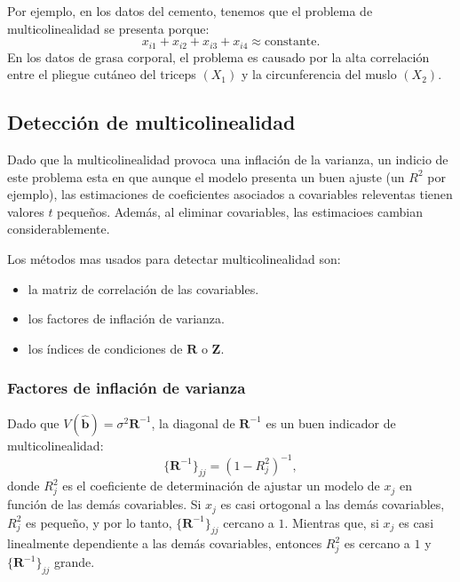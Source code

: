 \documentclass[
]{article}
\begin{document}
Por ejemplo, en los datos del cemento, tenemos que el problema de multicolinealidad se presenta porque:
\[
x_{i1} + x_{i2} + x_{i3} + x_{i4} \approx \mbox{constante}.   
\]
En los datos de grasa corporal, el problema es causado por la alta correlación entre el pliegue cutáneo del triceps \((X_{1})\) y la circunferencia del muslo \((X_{2})\).

\hypertarget{detecciuxf3n-de-multicolinealidad}{%
\subsection{Detección de multicolinealidad}\label{detecciuxf3n-de-multicolinealidad}}

Dado que la multicolinealidad provoca una inflación de la varianza, un indicio de este problema esta en que aunque el modelo presenta un buen ajuste (un \(R^2\) por ejemplo), las estimaciones de coeficientes asociados a covariables releventas tienen valores \(t\) pequeños. Además, al eliminar covariables, las estimacioes cambian considerablemente.

Los métodos mas usados para detectar multicolinealidad son:

\begin{itemize}
\item
  la matriz de correlación de las covariables.
\item
  los factores de inflación de varianza.
\item
  los índices de condiciones de \(\boldsymbol R\) o \(\boldsymbol Z\).
\end{itemize}

\hypertarget{factores-de-inflaciuxf3n-de-varianza}{%
\subsubsection{Factores de inflación de varianza}\label{factores-de-inflaciuxf3n-de-varianza}}

Dado que \(V(\widehat{\boldsymbol b}) = \sigma^2\boldsymbol R^{-1}\), la diagonal de \(\boldsymbol R^{-1}\) es un buen indicador de multicolinealidad:
\[
\{\boldsymbol R^{-1}\}_{jj} = (1-R_{j}^{2})^{-1},
\]
donde \(R_{j}^{2}\) es el coeficiente de determinación de ajustar un modelo de \(x_{j}\) en función de las demás covariables. Si \(x_{j}\) es casi ortogonal a las demás covariables, \(R^{2}_{j}\) es pequeño, y por lo tanto, \(\{\boldsymbol R^{-1}\}_{jj}\) cercano a \(1\). Mientras que, si \(x_{j}\) es casi linealmente dependiente a las demás covariables, entonces \(R^{2}_{j}\) es cercano a \(1\) y \(\{\boldsymbol R^{-1}\}_{jj}\) grande.
\end{document}
